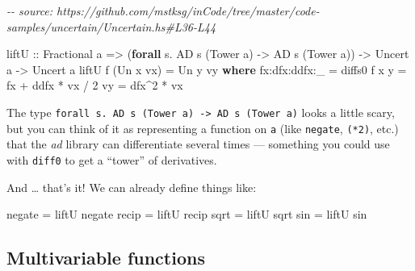 \documentclass[]{article}
\newenvironment{Shaded}{}{}
\newcommand{\CommentTok}[1]{\textcolor[rgb]{0.38,0.63,0.69}{\textit{#1}}}
\newcommand{\DataTypeTok}[1]{\textcolor[rgb]{0.56,0.13,0.00}{#1}}
\newcommand{\DecValTok}[1]{\textcolor[rgb]{0.25,0.63,0.44}{#1}}
\newcommand{\FunctionTok}[1]{\textcolor[rgb]{0.02,0.16,0.49}{#1}}
\newcommand{\KeywordTok}[1]{\textcolor[rgb]{0.00,0.44,0.13}{\textbf{#1}}}
\newcommand{\NormalTok}[1]{#1}
\newcommand{\OperatorTok}[1]{\textcolor[rgb]{0.40,0.40,0.40}{#1}}
\newcommand{\OtherTok}[1]{\textcolor[rgb]{0.00,0.44,0.13}{#1}}
\begin{document}
\begin{Shaded}
\begin{Highlighting}[]
\CommentTok{{-}{-} source: https://github.com/mstksg/inCode/tree/master/code{-}samples/uncertain/Uncertain.hs\#L36{-}L44}

\OtherTok{liftU ::} \DataTypeTok{Fractional}\NormalTok{ a}
      \OtherTok{=\textgreater{}}\NormalTok{ (}\KeywordTok{forall}\NormalTok{ s}\OperatorTok{.} \DataTypeTok{AD}\NormalTok{ s (}\DataTypeTok{Tower}\NormalTok{ a) }\OtherTok{{-}\textgreater{}} \DataTypeTok{AD}\NormalTok{ s (}\DataTypeTok{Tower}\NormalTok{ a))}
      \OtherTok{{-}\textgreater{}} \DataTypeTok{Uncert}\NormalTok{ a}
      \OtherTok{{-}\textgreater{}} \DataTypeTok{Uncert}\NormalTok{ a}
\NormalTok{liftU f (}\DataTypeTok{Un}\NormalTok{ x vx) }\OtherTok{=} \DataTypeTok{Un}\NormalTok{ y vy}
  \KeywordTok{where}
\NormalTok{    fx}\OperatorTok{:}\NormalTok{dfx}\OperatorTok{:}\NormalTok{ddfx}\OperatorTok{:}\NormalTok{\_ }\OtherTok{=}\NormalTok{ diffs0 f x}
\NormalTok{    y             }\OtherTok{=}\NormalTok{ fx }\OperatorTok{+}\NormalTok{ ddfx }\OperatorTok{*}\NormalTok{ vx }\OperatorTok{/} \DecValTok{2}
\NormalTok{    vy            }\OtherTok{=}\NormalTok{ dfx}\OperatorTok{\^{}}\DecValTok{2} \OperatorTok{*}\NormalTok{ vx}
\end{Highlighting}
\end{Shaded}

The type
\texttt{forall\ s.\ AD\ s\ (Tower\ a)\ -\textgreater{}\ AD\ s\ (Tower\ a)} looks
a little scary, but you can think of it as representing a function on \texttt{a}
(like \texttt{negate}, \texttt{(*2)}, etc.) that the \emph{ad} library can
differentiate several times --- something you could use with \texttt{diff0} to
get a ``tower'' of derivatives.

And \ldots{} that's it! We can already define things like:

\begin{Shaded}
\begin{Highlighting}[]
\FunctionTok{negate} \OtherTok{=}\NormalTok{ liftU }\FunctionTok{negate}
\FunctionTok{recip}  \OtherTok{=}\NormalTok{ liftU }\FunctionTok{recip}
\FunctionTok{sqrt}   \OtherTok{=}\NormalTok{ liftU }\FunctionTok{sqrt}
\FunctionTok{sin}    \OtherTok{=}\NormalTok{ liftU }\FunctionTok{sin}
\end{Highlighting}
\end{Shaded}

\subsection{Multivariable functions}\label{multivariable-functions}
\end{document}
